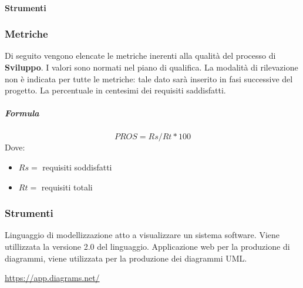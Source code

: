 \paragraph{Strumenti}
        \subsubsection{Metriche}
        Di seguito vengono elencate le metriche inerenti alla qualità del processo di \textbf{Sviluppo}. I valori sono normati nel piano di qualifica. La modalità di rilevazione non è indicata per tutte le metriche: tale dato sarà 
        inserito in fasi successive del progetto.
        La percentuale in centesimi dei requisiti saddisfatti.
        \subparagraph{Formula}
        \begin{displaymath}
         PROS = Rs / Rt *100
        \end{displaymath}
        Dove:
        \begin{itemize}
            \item[] $Rs =$ requisiti soddisfatti
            \item[] $Rt =$ requisiti totali
        \end{itemize}
        
        \subsubsection{Strumenti}
	    Linguaggio di modellizzazione atto a visualizzare un sistema software. Viene utillizzata la versione 2.0 del linguaggio.
	    Applicazione web per la produzione di diagrammi, viene utilizzata per la produzione dei diagrammi UML.\\
	    \centerline{\url{https://app.diagrams.net/}}